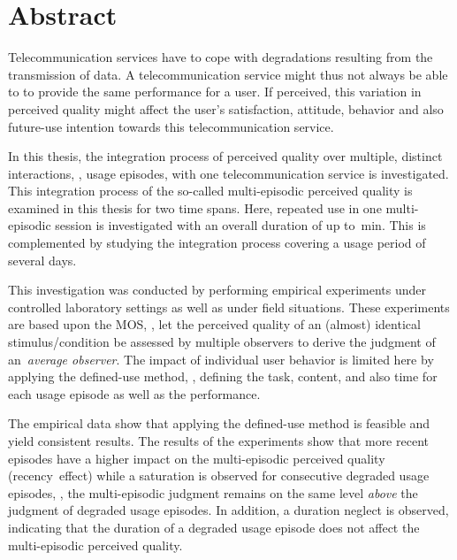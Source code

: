 
\chapter*{Abstract}
Telecommunication services have to cope with degradations resulting from the transmission of data.
A telecommunication service might thus not always be able to to provide the same performance for a user.
If perceived, this variation in perceived quality might affect the user's satisfaction, attitude, behavior and also future-use intention towards this telecommunication service.

In this thesis, the integration process of perceived quality over multiple, distinct interactions, \ie, usage episodes, with one telecommunication service is investigated.
This integration process of the so-called multi-episodic perceived quality is examined in this thesis for two time spans.
Here, repeated use in one multi-episodic session is investigated with an overall duration of up to~\unit[45]{min}.
This is complemented by studying the integration process covering a usage period of several days.

This investigation was conducted by performing empirical experiments under controlled laboratory settings as well as under field situations.
These experiments are based upon the \acs{MOS}, \ie, let the perceived quality of an (almost) identical stimulus/condition be assessed by multiple observers to derive the judgment of an~\emph{average observer}.
The impact of individual user behavior is limited here by applying the defined-use method, \ie, defining the task, content, and also time for each usage episode as well as the performance.

The empirical data show that applying the defined-use method is feasible and yield consistent results.
The results of the experiments show that more recent episodes have a higher impact on the multi-episodic perceived quality (recency~effect) while a saturation is observed for consecutive degraded usage episodes, \ie, the multi-episodic judgment remains on the same level \emph{above} the judgment of degraded usage episodes.
In addition, a duration neglect is observed, indicating that the duration of a degraded usage episode does not affect the multi-episodic perceived quality.

